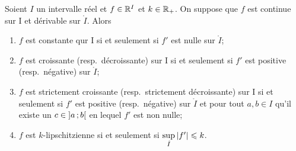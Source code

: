 \begin{theo}
  Soient \(I\) un intervalle réel et \(f \in \mathbb{R}^I\) et \(k \in \mathbb{R}_{+}\). On suppose que \(f\) est continue sur I et dérivable sur \(\mathring{I}\). Alors
  \begin{enumerate}
  \item \(f\) est constante qur I si et seulement si \(f'\) est nulle sur \(\mathring{I}\);
  \item \(f\) est croissante (resp.\ décroissante) sur I si et seulement si \(f'\) est positive (resp.\ négative) sur \(\mathring{I}\);
  \item \(f\) est strictement croissante (resp.\ strictement décroissante) sur I si et seulement si \(f'\) est positive (resp.\ négative) sur \(\mathring{I}\) et pour tout \(a,b \in I\) qu'il existe un \(c \in \left] a \, ;  b \right[\) en lequel \(f'\) est non nulle;
  \item \(f\) est \(k\)-lipschitzienne si et seulement si \(\sup\limits_{\mathring{I}} \left\lvert f'\right\rvert \leqslant k\).
  \end{enumerate}
\end{theo}
